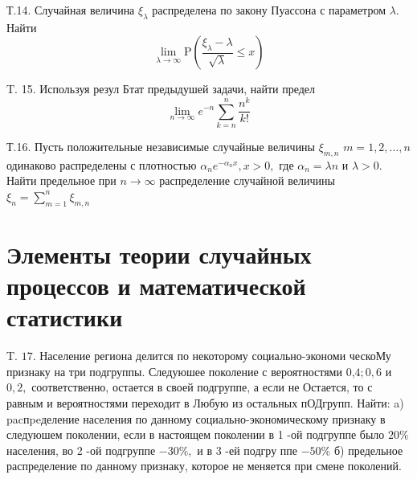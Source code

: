 \documentclass[a4paper,12pt]{article} %
\begin{document}
\begin{example}

Т.14. Случайная величина $\xi_{\lambda}$ распределена по закону Пуассона с параметром $\lambda .$ Найти
$$
\lim _{\lambda \rightarrow \infty} \mathrm{P}\left(\frac{\xi_{\lambda}-\lambda}{\sqrt{\lambda}} \leqslant x\right)
$$




\end{example}



\begin{example}

T. 15. Используя резул Бтат предыдушей задачи, найти предел
$$
\lim _{n \rightarrow \infty} e^{-n} \sum_{k=n}^{n} \frac{n^{k}}{k !}
$$




\end{example}





\begin{example}

Т.16. Пусть положительные независимые случайные величины $\xi_{m, n}$ $m=1,2, \ldots, n$ одинаково распределены с плотностью $\alpha_{n} e^{-\alpha_{n} x}, x>0,$ где $\alpha_{n}=\lambda n$ и $\lambda>0 .$ Найти предельное при $n \rightarrow \infty$ распределение случайной величины $\xi_{n}=\sum_{m=1}^{n} \xi_{m, n}$




\end{example}


\section{Элементы теории случайных процессов и математической статистики}




\begin{example}


T. $17 .$ Население региона делится по некоторому социально-экономи ческоМу признаку на три подгруппы. Следуюшее поколение с вероятностями 0,$4 ; 0,6$ и $0,2,$ соответственно, остается в своей подгруппе, а если не
Остается, то с равным и вероятностями переходит в Любую из остальных пОДгрупп. Найти:
a) pacпpeделение населения по данному социально-экономическому признаку в следуюшем поколении, если в настоящем поколении в 1 -ой подгруппе было $20 \%$ населения, во 2 -ой подгруппе $-30 \%,$ и в 3 -ей подгру ппе $-50 \%$
б) предельное распределение по данному признаку, которое не меняется при смене поколений.



\end{example}
\end{document}
